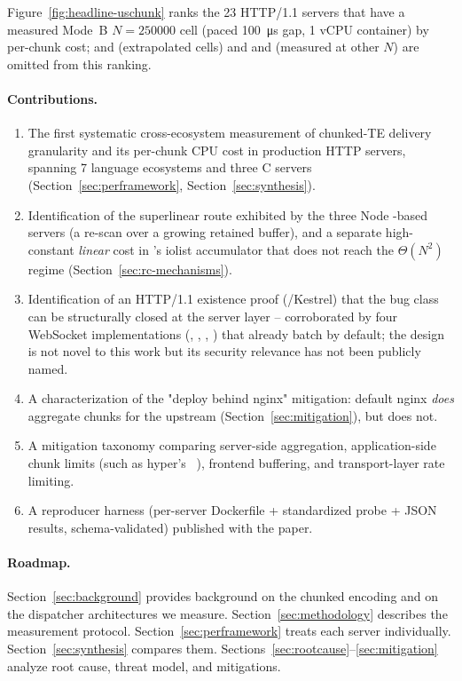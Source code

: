 \noindent
Figure~\ref{fig:headline-uschunk} ranks the 23 HTTP/1.1 servers
that have a measured Mode~B $N{=}\num{250000}$ cell (paced
\SI{100}{\micro\second} gap, 1 vCPU container) by per-chunk cost;
 and  (extrapolated cells) and
 and  (measured at other $N$) are
omitted from this ranking.

\paragraph{Contributions.}
\begin{enumerate}
  \item The first systematic cross-ecosystem measurement of
  chunked-TE delivery granularity and its per-chunk CPU cost in
  production HTTP servers,
  spanning 7 language ecosystems and three C servers
  (Section~\ref{sec:perframework}, Section~\ref{sec:synthesis}).
  \item Identification of the superlinear route exhibited by the
  three Node -based servers (a 
  re-scan over a growing retained  buffer), and a
  separate high-constant \emph{linear} cost in 's
  iolist accumulator that does not reach the $\Theta(N^2)$ regime
  (Section~\ref{sec:rc-mechanisms}).
  \item Identification of an HTTP/1.1 existence proof
  (/Kestrel) that the bug class can be
  structurally closed at the server layer -- corroborated by four
  WebSocket implementations (, ,
  , ) that already batch by
  default; the design is not novel to this work but its security
  relevance has not been publicly named.
  \item A characterization of the "deploy behind nginx" mitigation:
  default nginx \emph{does} aggregate chunks for the upstream
  (Section~\ref{sec:mitigation}), but  does not.
  \item A mitigation taxonomy comparing server-side aggregation,
  application-side chunk limits (such as hyper's
  ~\cite{hyper_4008}), frontend
  buffering, and transport-layer rate limiting.
  \item A reproducer harness (per-server Dockerfile + standardized
  probe + JSON results, schema-validated) published with the paper.
\end{enumerate}

\paragraph{Roadmap.}
Section~\ref{sec:background} provides background on the chunked
encoding and on the dispatcher architectures we measure.
Section~\ref{sec:methodology} describes the measurement protocol.
Section~\ref{sec:perframework} treats each server individually.
Section~\ref{sec:synthesis} compares them.
Sections~\ref{sec:rootcause}--\ref{sec:mitigation} analyze root
cause, threat model, and mitigations.

